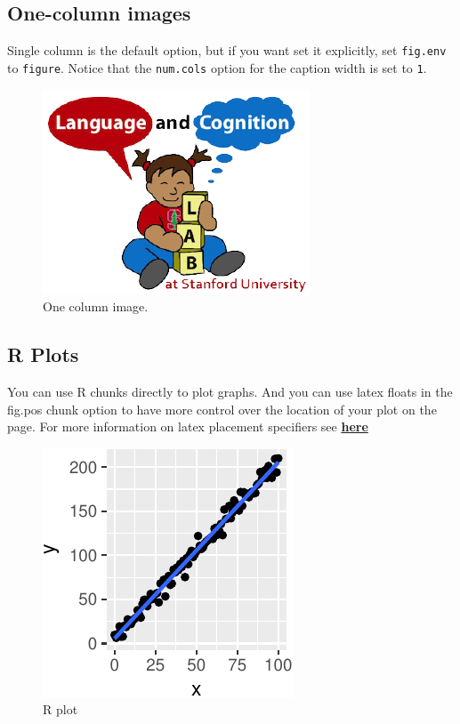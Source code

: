 \documentclass[10pt, letterpaper]{article}
\newenvironment{CodeChunk}{}{}
\begin{document}
\subsection{One-column images}\label{one-column-images}

Single column is the default option, but if you want set it explicitly,
set \texttt{fig.env} to \texttt{figure}. Notice that the
\texttt{num.cols} option for the caption width is set to \texttt{1}.

\begin{CodeChunk}
\begin{figure}[H]

{\centering \includegraphics{figs/image-1} 

}

\caption[One column image]{One column image.}\label{fig:image}
\end{figure}
\end{CodeChunk}

\subsection{R Plots}\label{r-plots}

You can use R chunks directly to plot graphs. And you can use latex
floats in the fig.pos chunk option to have more control over the
location of your plot on the page. For more information on latex
placement specifiers see
\textbf{\href{https://en.wikibooks.org/wiki/LaTeX/Floats,_Figures_and_Captions}{here}}

\begin{CodeChunk}
\begin{figure}[H]

{\centering \includegraphics{figs/plot-1} 

}

\caption[R plot]{R plot}\label{fig:plot}
\end{figure}
\end{CodeChunk}
\end{document}
